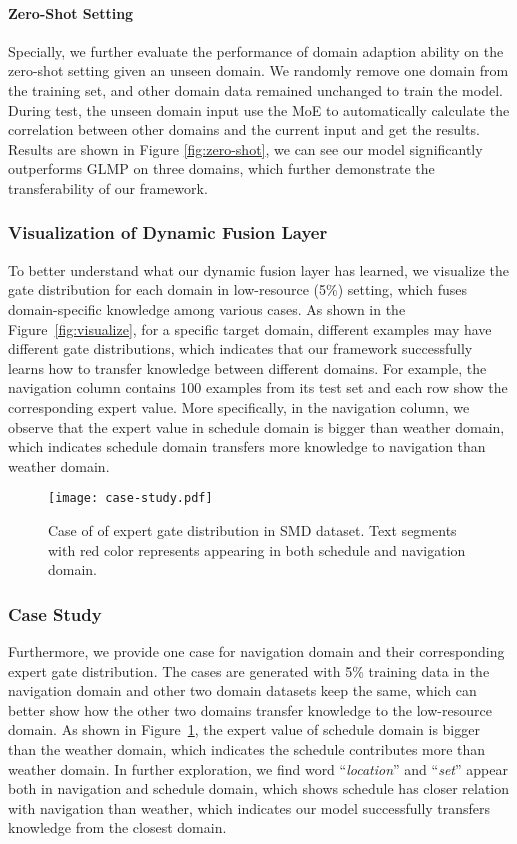 \documentclass[11pt,a4paper]{article}
\begin{document}
\paragraph{Zero-Shot Setting}
Specially, we further evaluate the performance of domain adaption ability on the zero-shot setting given an unseen domain. 
We randomly remove one domain from the training set, and other domain data remained unchanged to train the model.
During test, the unseen domain input use the MoE to automatically calculate the correlation between other domains and the current input and get the results. 
Results are shown in Figure \ref{fig:zero-shot}, we can see our model significantly outperforms GLMP on three domains, which further demonstrate the transferability of our framework.

\subsubsection{Visualization of Dynamic Fusion Layer}
To better understand what our dynamic fusion layer has learned, we visualize the gate distribution for each domain in low-resource (5\%) setting, which fuses domain-specific knowledge among various cases. 
As shown in the Figure~\ref{fig:visualize}, for a specific target domain, different examples may have different gate distributions, which indicates that our framework successfully learns how to transfer knowledge between different domains. 
For example, the navigation column contains 100 examples from its test set and each row show the corresponding expert value. 
More specifically, in the navigation column, we observe that the expert value in schedule domain is bigger than weather domain, which indicates schedule domain transfers more knowledge to navigation than weather domain.
\begin{figure}[t]
	\centering
\texttt{[image: case-study.pdf]}
	\caption{
		Case of of expert gate distribution in SMD dataset. Text segments with red color represents appearing in both schedule and navigation domain.
	}
	\label{fig:visualize-case}
\end{figure}

\subsubsection{Case Study}
Furthermore, we provide one case for navigation domain and their corresponding expert gate distribution.
The cases are generated with 5\% training data in the navigation domain and other two domain datasets keep the same, which can better show how the other two domains transfer knowledge to the low-resource domain. 
As shown in Figure~\ref{fig:visualize-case},  the expert value of schedule domain is bigger than the weather domain, which indicates the schedule contributes more than weather domain.
In further exploration, we find word ``\textit{location}''  and ``\textit{set}'' appear both in navigation and schedule domain, which shows schedule has closer relation with navigation than weather, which indicates our model successfully transfers knowledge from the closest domain.
\end{document}

